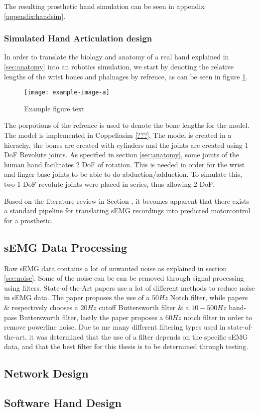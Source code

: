 \documentclass[../main.tex]{subfiles}
\begin{document}
The resulting prosthetic hand simulation can be seen in appendix \ref{appendix:handsim}.

\subsubsection{Simulated Hand Articulation design}

In order to translate the biology and anatomy of a real hand explained in \ref{sec:anatomy} into an robotics simulation, we start by denoting the relative lengths of the wrist bones and phalnages by refrence, as can be seen in figure \ref{fig:handref}.

\begin{figure}[h]
\begin{center}
\texttt{[image: example-image-a]}
\caption{Example figure text}
\label{fig:handref}
\end{center}
\end{figure}

The porpotions of the refrence is used to denote the bone lengths for the model.
The model is implemented in Coppeliasim \ref{???}, The model is created in a hierachy, the bones are created with cylinders and the joints are created using 1 DoF Revolute joints.
As specified in section \ref{sec:anatomy}, some joints of the human hand facilitates 2 DoF of rotation.
This is needed in order for the wrist and finger base joints to be able to do \gls{abduction/adduction}.
To simulate this, two 1 DoF revolute joints were placed in series, thus allowing 2 DoF.



Based on the literature review in Section \label{sec:literature}, it becomes apparent that there exists a standard pipeline for translating sEMG recordings into predicted motorcontrol for a prosthetic.

\subsection{sEMG Data Processing}

Raw sEMG data contains a lot of unwanted noise as explained in section \ref{sec:noise}.
Some of the noise can be can be removed through signal processing using filters.
State-of-the-Art papers use a lot of different methods to reduce noise in sEMG data.
The paper \cite{multdof} proposes the use of a $50Hz$ Notch filter, while papers \cite{graspintent} \& \cite{ashirbad2022} respectively chooses a $20Hz$ cutoff Buttersworth filter \& a $10-500Hz$ band-pass Buttersworth filter, lastly the paper proposes a $60Hz$ notch filter in order to remove powerline noise.
Due to me many different filtering types used in state-of-the-art, it was determined that the use of a filter depends on the specific sEMG data, and that the best filter for this thesis is to be determined through testing.

\subsection{Network Design}
\subsection{Software Hand Design}
\end{document}
